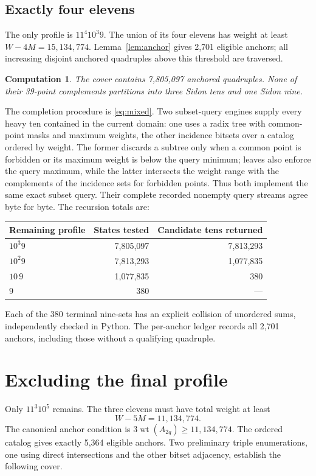 \documentclass[11pt]{article}
\newtheorem{computation}[theorem]{Computation}
\newcommand{\wt}{\operatorname{wt}}
\begin{document}
\subsection{Exactly four elevens}
The only profile is $11^4 10^3 9$. The union of its four elevens has
weight at least $W-4M=15,134,774$. Lemma~\ref{lem:anchor} gives 2,701
eligible anchors; all increasing disjoint anchored quadruples above
this threshold are traversed.

\begin{computation}\label{comp:four}
The cover contains 7,805,097 anchored quadruples. None of their 39-point
complements partitions into three Sidon tens and one Sidon nine.
\end{computation}

The completion procedure is \eqref{eq:mixed}. Two subset-query engines
supply every heavy ten contained in the current domain: one uses a
radix tree with common-point masks and maximum weights, the other incidence
bitsets over a catalog ordered by weight. The former discards a subtree
only when a common point is forbidden or its maximum weight is below
the query minimum; leaves also enforce the query maximum, while the latter intersects the weight range with the complements
of the incidence sets for forbidden points. Thus both implement the
same exact subset query. Their complete recorded nonempty query streams
agree byte for byte. The recursion totals are:
\begin{center}
\begin{tabular}{lrr}
\toprule
Remaining profile&States tested&Candidate tens returned\\
\midrule
$10^3 9$&7,805,097&7,813,293\\
$10^2 9$&7,813,293&1,077,835\\
$10\,9$&1,077,835&380\\
$9$&380&---\\
\bottomrule
\end{tabular}
\end{center}
Each of the 380 terminal nine-sets has an explicit collision of unordered
sums, independently checked in Python. The per-anchor ledger records
all 2,701 anchors, including those without a qualifying quadruple.

\section{Excluding the final profile}\label{sec:balanced}
Only $11^3 10^5$ remains. The three elevens must have total weight at
least
\begin{equation}\label{eq:triple}
                        W-5M=11{,}134{,}774.
\end{equation}
The canonical anchor condition is $3\wt(A_{2q})\geq11,134,774$.
The ordered catalog gives exactly 5,364 eligible anchors. Two preliminary
triple enumerations, one using direct intersections and the other bitset
adjacency, establish the following cover.
\end{document}
